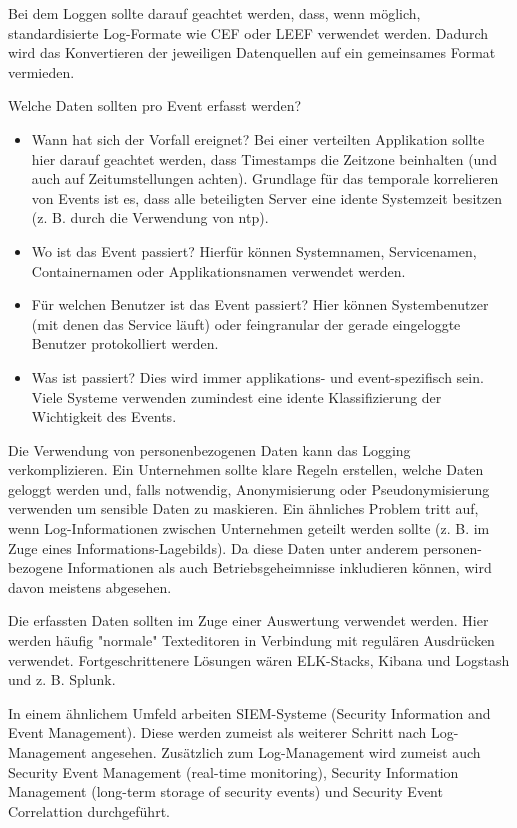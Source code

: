 Bei dem Loggen sollte darauf geachtet werden, dass, wenn möglich, standardisierte Log-Formate wie CEF oder LEEF verwendet werden. Dadurch wird das Konvertieren der jeweiligen Datenquellen auf ein gemeinsames Format vermieden.

Welche Daten sollten pro Event erfasst werden?

\begin{itemize}
	\item Wann hat sich der Vorfall ereignet? Bei einer verteilten Applikation sollte hier darauf geachtet werden, dass Timestamps die Zeitzone beinhalten (und auch auf Zeitumstellungen achten). Grundlage für das temporale korrelieren von Events ist es, dass alle beteiligten Server eine idente Systemzeit besitzen (z. B. durch die Verwendung von ntp).
	\item Wo ist das Event passiert? Hierfür können Systemnamen, Servicenamen, Containernamen oder Applikationsnamen verwendet werden.
	\item Für welchen Benutzer ist das Event passiert? Hier können Systembenutzer (mit denen das Service läuft) oder feingranular der gerade eingeloggte Benutzer protokolliert werden.
	\item Was ist passiert? Dies wird immer applikations- und event-spezifisch sein. Viele Systeme verwenden zumindest eine idente Klassifizierung der Wichtigkeit des Events.
\end{itemize}

Die Verwendung von personenbezogenen Daten kann das Logging verkomplizieren. Ein Unternehmen sollte klare Regeln erstellen, welche Daten geloggt werden und, falls notwendig, Anonymisierung oder Pseudonymisierung verwenden um sensible Daten zu maskieren. Ein ähnliches Problem tritt auf, wenn Log-Informationen zwischen Unternehmen geteilt werden sollte (z. B. im Zuge eines Informations-Lagebilds). Da diese Daten unter anderem personen-bezogene Informationen als auch Betriebsgeheimnisse inkludieren können, wird davon meistens abgesehen.

Die erfassten Daten sollten im Zuge einer Auswertung verwendet werden. Hier werden häufig "normale" Texteditoren in Verbindung mit regulären Ausdrücken verwendet. Fortgeschrittenere Lösungen wären ELK-Stacks, Kibana und Logstash und z. B. Splunk.

In einem ähnlichem Umfeld arbeiten SIEM-Systeme (Security Information and Event Management). Diese werden zumeist als weiterer Schritt nach Log-Management angesehen. Zusätzlich zum Log-Management wird zumeist auch Security Event Management (real-time monitoring), Security Information Management (long-term storage of security events) und Security Event Correlattion durchgeführt.

